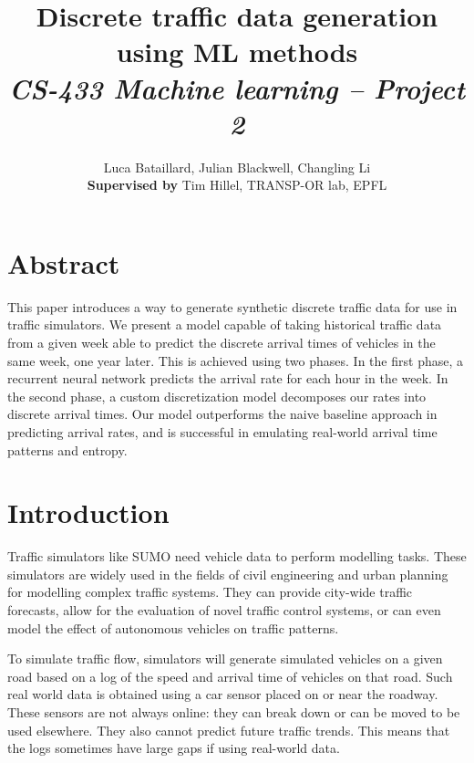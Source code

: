 \documentclass[10pt,conference,compsocconf]{IEEEtran}
\begin{document}
\title{%
    Discrete traffic data generation using ML methods \\
    \large \textit{CS-433 Machine learning -- Project 2}
}

\author{
  Luca Bataillard, Julian Blackwell, Changling Li\\
  \textbf{Supervised by} Tim Hillel, TRANSP-OR lab, EPFL
}

\maketitle



\section*{Abstract}

This paper introduces a way to generate synthetic discrete traffic data for use in traffic
simulators. We present a model capable of taking historical traffic data from a given week able to
predict the discrete arrival times of vehicles in the same week, one year later. This is achieved 
using two phases. In the first phase, a recurrent neural network predicts the arrival rate for each 
hour in the week. In the second phase, a custom discretization model decomposes our rates into 
discrete arrival times. Our model outperforms the naive baseline approach in predicting arrival rates, and is successful in emulating real-world arrival time patterns and entropy.



\section{Introduction}

Traffic simulators like SUMO need vehicle data to perform modelling tasks. These
simulators are widely used in the fields of civil engineering and urban planning for modelling
complex traffic systems. They can provide city-wide traffic forecasts, allow for the evaluation 
of novel traffic control systems, or can even model the effect of autonomous vehicles on traffic
patterns. \cite{SUMO2018}

To simulate traffic flow, simulators will generate simulated vehicles on a given road based on a 
log of the speed and arrival time of vehicles on that road. Such real world data is obtained using 
a car sensor placed on or near the roadway. These sensors are not always online: they can break 
down or can be moved to be used elsewhere. They also cannot predict future traffic trends. This 
means that the logs sometimes have large gaps if using real-world data.
\end{document}
